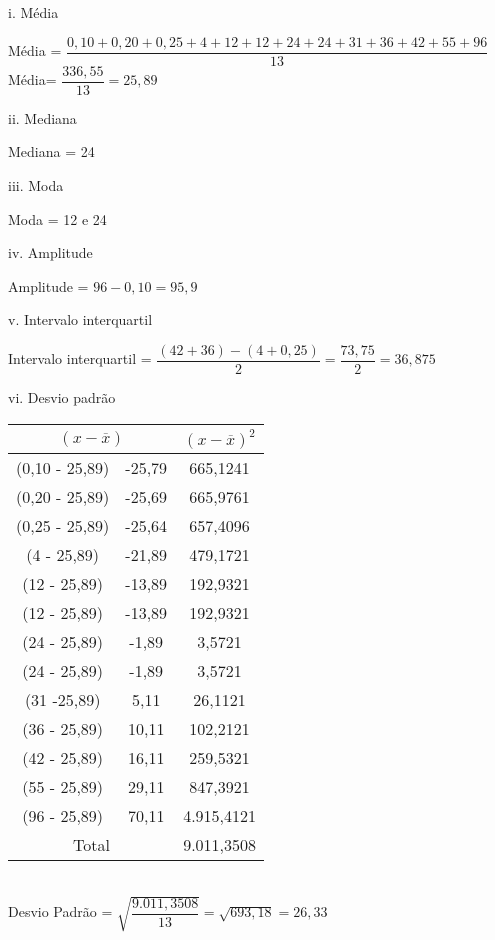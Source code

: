 \documentclass[12pt,a4paper]{article}
\begin{document}
	i. Média
	\begin{center}
		\vspace{0.25cm}
		Média = $\dfrac{0,10 + 0,20 + 0,25 + 4 + 12 + 12 + 24 +	24 + 31 + 36 + 42 + 55 + 96}{13}$\\
		\vspace{0.25cm}
		Média= $\dfrac{336,55}{13} = 25,89$
	\end{center}
	\vspace{0.5cm}
	ii. Mediana\\
	\begin{center}
		Mediana = 24
	\end{center}
	\vspace{0.5cm}
	iii. Moda\\
	\begin{center}
		Moda = 12 e 24
	\end{center}
	\vspace{0.5cm}
	iv. Amplitude\\
	\begin{center}
		Amplitude = $96 - 0,10 = 95,9$
	\end{center}
	\vspace{0.5cm}
	v. Intervalo interquartil\\
	\begin{center}
		Intervalo interquartil = $\dfrac{(42 + 36) - (4 + 0,25)}{2} = \dfrac{73,75}{2} = 36,875$
	\end{center}
	\vspace{0.5cm}
	vi. Desvio padrão\\
		\begin{center}
			\begin{tabular}{|c|c|c|} \hline
				\multicolumn{2}{|c|}{$(x - \overline{x})$} & $(x - \overline{x})^2$\\ \hline
				(0,10 - 25,89) & -25,79 & 665,1241\\ \hline
				(0,20 -  25,89) & -25,69 & 665,9761\\ \hline
				(0,25 - 25,89) & -25,64 & 657,4096\\ \hline
				(4 - 25,89) & -21,89 & 479,1721\\ \hline
				(12 - 25,89) & -13,89 & 192,9321\\ \hline
				(12 - 25,89) & -13,89 & 192,9321\\ \hline
				(24 - 25,89) & -1,89 & 3,5721\\ \hline
				(24 - 25,89) & -1,89 & 3,5721\\ \hline
				(31 -25,89) & 5,11 & 26,1121\\ \hline
				(36 - 25,89) & 10,11 & 102,2121\\ \hline
				(42 - 25,89) & 16,11 & 259,5321\\ \hline
				(55 - 25,89) & 29,11 & 847,3921\\ \hline
				(96 - 25,89) & 70,11 & 4.915,4121\\ \hline
				\multicolumn{2}{|c|}{Total} & 9.011,3508\\ \hline
			\end{tabular}
		\vspace{0.5cm}\\
		Desvio Padrão = $\sqrt{\dfrac{9.011,3508}{13}} = \sqrt{693,18} = 26,33$
		\end{center}
\end{document}
